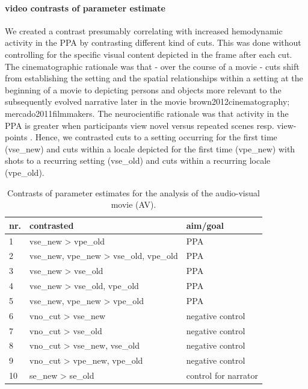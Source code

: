 \documentclass[english]{article}
\begin{document}
\paragraph{video contrasts of parameter estimate}
We created a contrast presumably correlating with increased hemodynamic activity in the PPA by contrasting different kind of cuts.
This was done without controlling for the specific visual content depicted in the frame after each cut.
The cinematographic rationale was that - over the course of a movie - cuts shift from establishing the setting and the spatial relationships within a setting at the beginning of a movie to depicting persons and objects more relevant to the subsequently evolved narrative later in the movie {brown2012cinematography; mercado2011filmmakers}.
The neurocientific rationale was that activity in the PPA is greater when participants view novel versus repeated scenes resp. view-points \citep{epstein1999parahippocampal}.
Hence, we contrasted cuts to a setting occurring for the first time (vse\_new) and cuts within a locale depicted for the first time (vpe\_new) with shots to a recurring setting (vse\_old) and cuts within a recurring locale (vpe\_old).


\begin{table}[t]
    \caption{Contrasts of parameter estimates for the analysis of the audio-visual movie (AV).}
\label{tab:av-contrasts}
\footnotesize
\begin{tabular}{lll}
\toprule
\textbf{nr.} &  \textbf{contrasted} & \textbf{aim/goal} \\
\midrule
1 & vse\_new > vpe\_old  & PPA \tabularnewline
2 & vse\_new, vpe\_new > vse\_old, vpe\_old & PPA \tabularnewline
3 & vse\_new > vse\_old & PPA \tabularnewline
4 & vse\_new > vse\_old, vpe\_old & PPA \tabularnewline
5 & vse\_new, vpe\_new > vpe\_old & PPA \tabularnewline
6 & vno\_cut > vse\_new & negative control \tabularnewline
7 & vno\_cut > vse\_old & negative control \tabularnewline
8 & vno\_cut > vse\_new, vse\_old & negative control \tabularnewline
9 & vno\_cut > vpe\_new, vpe\_old & negative control \tabularnewline
10 & se\_new > se\_old & control for narrator \tabularnewline
\end{tabular}
\end{table}
\end{document}
